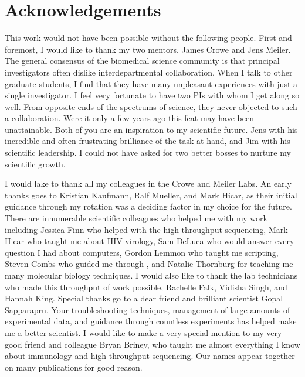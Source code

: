 \chapter*{Acknowledgements}
\vspace{7mm}
This work would not have been possible without the following people.
First and foremost, I would like to thank my two mentors, James Crowe and Jens Meiler. The general consensus of the biomedical science community is that principal investigators often dislike interdepartmental collaboration. When I talk to other graduate students, I find that they have many unpleasant experiences with just a single investigator. I feel very fortunate to have two PIs with whom I get along so well. From opposite ends of the spectrums of science, they never objected to such a collaboration. Were it only a few years ago this feat may have been unattainable. Both of you are an inspiration to my scientific future. Jens with his incredible and often frustrating brilliance of the task at hand, and Jim with his scientific leadership. I could not have asked for two better bosses to nurture my scientific growth.

I would lake to thank all my colleagues in the Crowe and Meiler Labs. An early thanks goes to Kristian Kaufmann, Ralf Mueller, and Mark Hicar, as their initial guidance through my rotation was a deciding factor in my choice for the future. There are innumerable scientific colleagues who helped me with my work including Jessica Finn who helped with the high-throughput sequencing, Mark Hicar who taught me about HIV virology, Sam DeLuca who would answer every question I had about computers, Gordon Lemmon who taught me scripting, Steven Combs who guided me through \rosetta, and Natalie Thornburg for teaching me many molecular biology techniques. I would also like to thank the lab technicians who made this throughput of work possible, Rachelle Falk, Vidisha Singh, and Hannah King. Special thanks go to a dear friend and brilliant scientist Gopal Sapparapru. Your troubleshooting techniques, management of large amounts of experimental data, and guidance through countless experiments has helped make me a better scientist. I would like to make a very special mention to my very good friend and colleague Bryan Briney, who taught me almost everything I know about immunology and high-throughput sequencing. Our names appear together on many publications for good reason.

